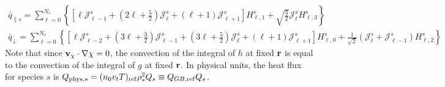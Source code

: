 \documentclass{jpp}
\begin{document}
{\begin{gather}
     \bar{q}_{\parallel s} = \sum_{\ell=0}^{N_\ell} \left\{\left[\ell \mathcal{J}^s_{\ell-1}+ (2\ell+\frac{5}{2})\mathcal{J}^s_\ell
     + (\ell+1)\mathcal{J}^s_{\ell+1}\right] H^s_{\ell,1}  +  \sqrt{\frac{3}{2}} \mathcal{J}^s_\ell H^s_{\ell,3}  \right\} \\
     \bar{q}_\perp = \sum_{\ell=0}^{N_\ell} \left\{ 
  \left[\ell \mathcal{J}^s_{\ell-2} + (3\ell+\frac{3}{2})\mathcal{J}^s_{\ell-1}+ (3\ell+\frac{5}{2})\mathcal{J}^s_\ell 
     + (\ell+1)\mathcal{J}^s_{\ell+1}\right] H^s_{\ell,0} + \frac{1}{\sqrt{2}}(\mathcal{J}^s_\ell + \mathcal{J}^s_{\ell-1}) H^s_{\ell,2} \right\}
\end{gather}
Note that since ${\bf v}_{\chi} \cdot \nabla \chi = 0$, the convection of the
integral of $h$ at fixed ${\bf r}$ is equal to the convection of the
integral of $g$ at fixed ${\bf r}$. In physical units, the heat flux for species $s$ is $Q_{{\rm phys},
  s} = (n_0 v_t T)_{\rm ref} \rho_*^2 Q_s\equiv Q_{GB,\mathrm{ref}} Q_s$.

}
\end{document}
